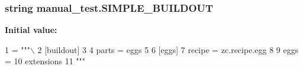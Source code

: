 \subsubsection[{S\+I\+M\+P\+L\+E\+\_\+\+B\+U\+I\+L\+D\+O\+U\+T}]{\setlength{\rightskip}{0pt plus 5cm}string manual\+\_\+test.\+S\+I\+M\+P\+L\+E\+\_\+\+B\+U\+I\+L\+D\+O\+U\+T}\label{namespacemanual__test_a90a129b17e1a45d7248fe9225291e3be}
{\bfseries Initial value\+:}
\begin{DoxyCode}
1 = \textcolor{stringliteral}{"""\(\backslash\)}
2 \textcolor{stringliteral}{[buildout]}
3 \textcolor{stringliteral}{}
4 \textcolor{stringliteral}{parts = eggs}
5 \textcolor{stringliteral}{}
6 \textcolor{stringliteral}{[eggs]}
7 \textcolor{stringliteral}{recipe = zc.recipe.egg}
8 \textcolor{stringliteral}{}
9 \textcolor{stringliteral}{eggs =}
10 \textcolor{stringliteral}{    extensions}
11 \textcolor{stringliteral}{"""}
\end{DoxyCode}
